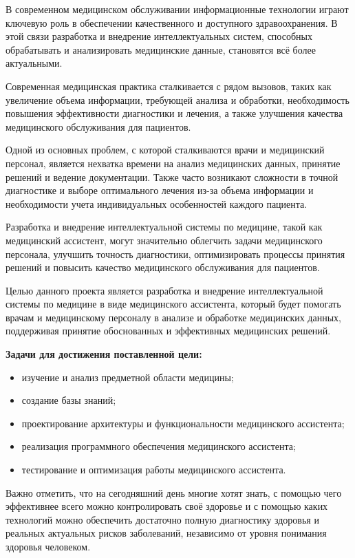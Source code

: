 
В современном медицинском обслуживании информационные технологии играют ключевую роль в обеспечении качественного и доступного здравоохранения. В этой связи разработка и внедрение интеллектуальных систем, способных обрабатывать и анализировать медицинские данные, становятся всё более актуальными.

Современная медицинская практика сталкивается с рядом вызовов, таких как увеличение объема информации, требующей анализа и обработки, необходимость повышения эффективности диагностики и лечения, а также улучшения качества медицинского обслуживания для пациентов.

Одной из основных проблем, с которой сталкиваются врачи и медицинский персонал, является нехватка времени на анализ медицинских данных, принятие решений и ведение документации. Также часто возникают сложности в точной диагностике и выборе оптимального лечения из-за объема информации и необходимости учета индивидуальных особенностей каждого пациента.

Разработка и внедрение интеллектуальной системы по медицине, такой как медицинский ассистент, могут значительно облегчить задачи медицинского персонала, улучшить точность диагностики, оптимизировать процессы принятия решений и повысить качество медицинского обслуживания для пациентов.

Целью данного проекта является разработка и внедрение интеллектуальной системы по медицине в виде медицинского ассистента, который будет помогать врачам и медицинскому персоналу в анализе и обработке медицинских данных, поддерживая принятие обоснованных и эффективных медицинских решений.

\textbf{Задачи для достижения поставленной цели:}
\begin{itemize}
    \item изучение и анализ предметной области медицины;
    \item создание базы знаний;
    \item проектирование архитектуры и функциональности медицинского ассистента;
    \item реализация программного обеспечения медицинского ассистента;
    \item тестирование и оптимизация работы медицинского ассистента.
\end{itemize}

Важно отметить, что на сегодняшний день многие хотят знать, с
помощью чего эффективнее всего можно контролировать своё здоровье и с помощью каких технологий можно обеспечить достаточно полную диагностику здоровья и реальных актуальных рисков заболеваний, независимо от уровня понимания здоровья человеком.